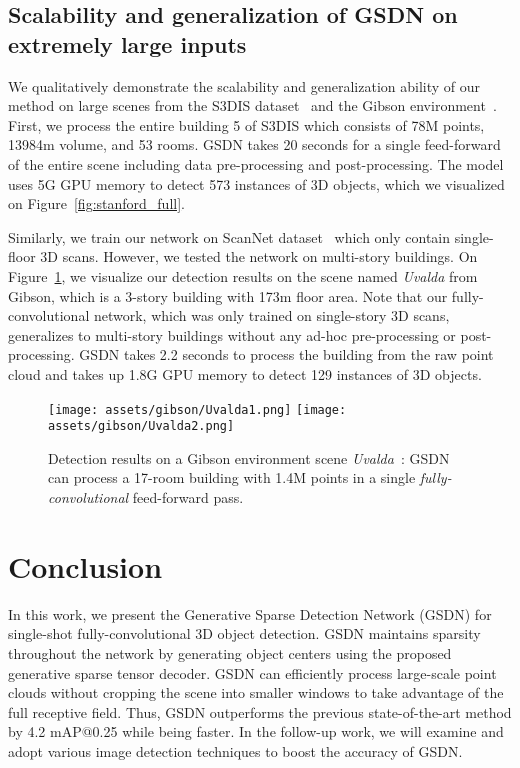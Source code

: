 \documentclass[runningheads]{llncs}
\newcommand{\methodname}{GSDN\xspace}
\begin{document}
\subsection{Scalability and generalization of \methodname on extremely large inputs}
\label{sec:scalability}


We qualitatively demonstrate the scalability and generalization ability of our method on large scenes from the S3DIS dataset~\cite{armeni_cvpr16} and the Gibson environment~\cite{xiazamirhe2018gibsonenv}.
First, we process the entire building 5 of S3DIS which consists of 78M points, 13984m volume, and 53 rooms.
\methodname takes 20 seconds for a single feed-forward of the entire scene including data pre-processing and post-processing. The model uses 5G GPU memory to detect 573 instances of 3D objects, which we visualized on Figure~\ref{fig:stanford_full}.

Similarly, we train our network on ScanNet dataset~\cite{dai2017scannet} which only contain single-floor 3D scans. However, we tested the network on multi-story buildings. On Figure~\ref{fig:gibson}, we visualize our detection results on the scene named \textit{Uvalda} from Gibson, which is a 3-story building with 173m floor area. Note that our fully-convolutional network, which was only trained on single-story 3D scans, generalizes to multi-story buildings without any ad-hoc pre-processing or post-processing.
\methodname takes 2.2 seconds to process the building from the raw point cloud and takes up 1.8G GPU memory to detect 129 instances of 3D objects.


\begin{figure}[h]
    \centering
    \texttt{[image: assets/gibson/Uvalda1.png]}
    \texttt{[image: assets/gibson/Uvalda2.png]}
    \caption{Detection results on a Gibson environment scene \textit{Uvalda}~\cite{xiazamirhe2018gibsonenv}: \methodname can process a 17-room building with 1.4M points in a single \textit{fully-convolutional} feed-forward pass.} \label{fig:gibson}
    \vspace{-1em}
\end{figure} 
\section{Conclusion}

In this work, we present the Generative Sparse Detection Network (\methodname) for single-shot fully-convolutional 3D object detection. \methodname maintains sparsity throughout the network by generating object centers using the proposed generative sparse tensor decoder. \methodname can efficiently process large-scale point clouds without cropping the scene into smaller windows to take advantage of the full receptive field. Thus, \methodname outperforms the previous state-of-the-art method by 4.2 mAP@0.25 while being  faster. In the follow-up work, we will examine and adopt various image detection techniques to boost the accuracy of \methodname.
\end{document}
